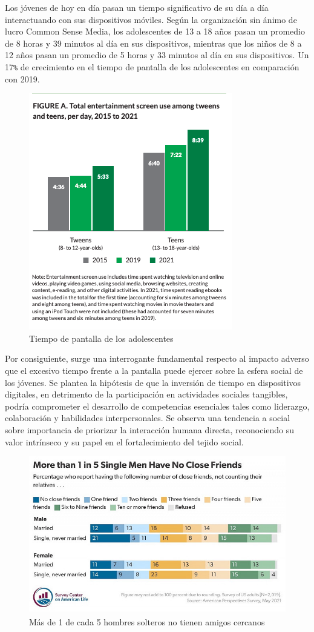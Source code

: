 Los jóvenes de hoy en día pasan un tiempo significativo de su día a día interactuando con sus dispositivos móviles. 
Según la organización sin ánimo de lucro Common Sense Media, los adolescentes de 13 a 18 años 
pasan un promedio de 8 horas y 39 minutos al día en sus dispositivos, 
mientras que los niños de 8 a 12 años pasan un promedio de 5 horas y 33 minutos al día en sus dispositivos\cite{REF13}.
Un 17\verb|%| de crecimiento en el tiempo de pantalla de los adolescentes en comparación con 2019.
\begin{figure}[H]
  \centering
  \includegraphics[width=0.7\linewidth]{images/estadodelarte/screentimeteens.png}
  \caption{Tiempo de pantalla de los adolescentes}
  \label{fig:tiempo_pantalla}
\end{figure}
Por consiguiente, surge una interrogante fundamental respecto al impacto adverso que el excesivo tiempo frente a la pantalla puede ejercer sobre la esfera social de los jóvenes. 
Se plantea la hipótesis de que la inversión de tiempo en dispositivos digitales, en detrimento de la participación en actividades sociales tangibles, 
podría comprometer el desarrollo de competencias esenciales tales como liderazgo, colaboración y habilidades interpersonales. 
Se observa una tendencia a social sobre importancia de priorizar la interacción humana directa, reconociendo su valor intrínseco y su papel en el fortalecimiento del tejido social.

\begin{figure}[H]
  \centering
  \includegraphics[width=0.7\linewidth]{images/estadodelarte/noclosefriends.jpeg}
  \caption{Más de 1 de cada 5 hombres solteros no tienen amigos cercanos}
  \label{fig:no_close_friends}
\end{figure}

